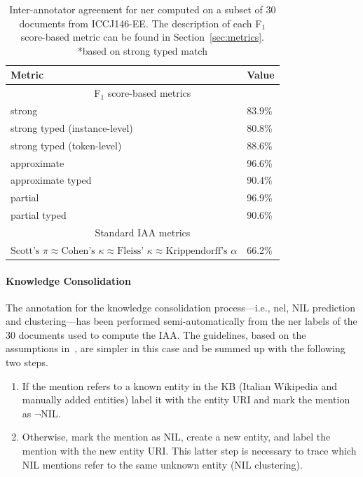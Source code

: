\begin{table}[]
\centering
\begin{tabular}{l|l}
\toprule
\textbf{Metric}                     & \textbf{Value} \\\toprule
\multicolumn{2}{c}{F$_1$ score-based metrics} \\\midrule
strong                              & 83.9\%           \\
strong typed (instance-level)       & 80.8\%           \\
strong typed (token-level)          & 88.6\%           \\
approximate                         & 96.6\%           \\
approximate typed                   & 90.4\%           \\
partial                             & 96.9\%           \\
partial typed                       & 90.6\%           \\\midrule
\multicolumn{2}{c}{Standard IAA metrics} \\\midrule
$\text{Scott's~}\pi \approx \text{Cohen's~}\kappa \approx \text{Fleiss'~}\kappa \approx \text{Krippendorff's~}\alpha$
 & 66.2\%           \\\bottomrule
\end{tabular}
\caption{Inter-annotator agreement for \ac{ner} computed on a subset of 30 documents from ICCJ146-EE. The description of each F$_1$ score-based metric can be found in Section~\ref{sec:metrics}. *based on strong typed match}
\label{tab:iaa}
\end{table}


\paragraph{Knowledge Consolidation}

The annotation for the knowledge consolidation process---i.e., \ac{nel}, NIL prediction and clustering---has been performed semi-automatically from the \ac{ner} labels of the 30 documents used to compute the IAA. The guidelines, based on the assumptions in~\cite{jha2017all}, are simpler in this case and be summed up with the following two steps.

\begin{enumerate}
    \item If the mention refers to a known entity in the KB (Italian Wikipedia and manually added entities) label it with the entity URI and mark the mention as $\neg$NIL.
    \item Otherwise, mark the mention as NIL, create a new entity, and label the mention with the new entity URI. This latter step is necessary to trace which NIL mentions refer to the same unknown entity (NIL clustering). 
\end{enumerate}

